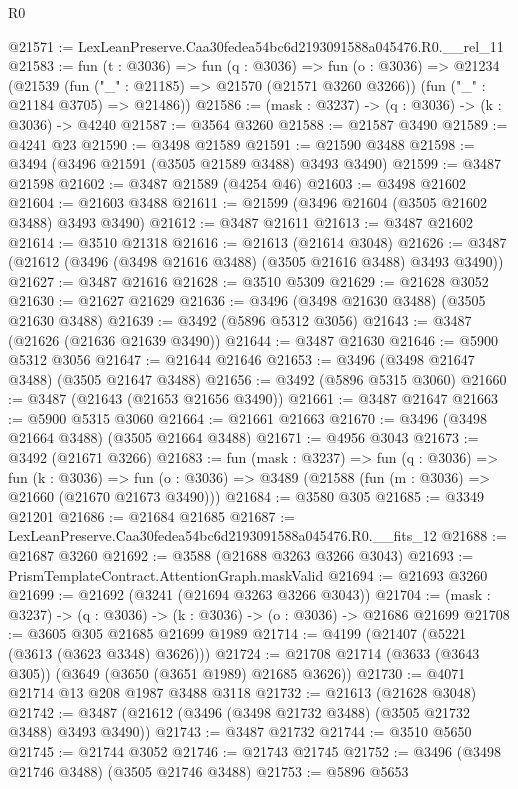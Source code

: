 \begin{lexlean}{R0}
\begin{coremodule}
@21571 := LexLeanPreserve.Caa30fedea54bc6d2193091588a045476.R0.__rel_11
@21583 := fun (t : @3036) =>
  fun (q : @3036) =>
  fun (o : @3036) =>
  @21234
    (@21539
      (fun ("_" : @21185) => @21570 (@21571 @3260 @3266))
      (fun ("_" : @21184 @3705) => @21486))
@21586 := (mask : @3237) -> (q : @3036) -> (k : @3036) -> @4240
@21587 := @3564 @3260
@21588 := @21587 @3490
@21589 := @4241 @23
@21590 := @3498 @21589
@21591 := @21590 @3488
@21598 := @3494 (@3496 @21591 (@3505 @21589 @3488) @3493 @3490)
@21599 := @3487 @21598
@21602 := @3487 @21589 (@4254 @46)
@21603 := @3498 @21602
@21604 := @21603 @3488
@21611 := @21599 (@3496 @21604 (@3505 @21602 @3488) @3493 @3490)
@21612 := @3487 @21611
@21613 := @3487 @21602
@21614 := @3510 @21318
@21616 := @21613 (@21614 @3048)
@21626 := @3487 (@21612 (@3496 (@3498 @21616 @3488) (@3505 @21616 @3488) @3493 @3490))
@21627 := @3487 @21616
@21628 := @3510 @5309
@21629 := @21628 @3052
@21630 := @21627 @21629
@21636 := @3496 (@3498 @21630 @3488) (@3505 @21630 @3488)
@21639 := @3492 (@5896 @5312 @3056)
@21643 := @3487 (@21626 (@21636 @21639 @3490))
@21644 := @3487 @21630
@21646 := @5900 @5312 @3056
@21647 := @21644 @21646
@21653 := @3496 (@3498 @21647 @3488) (@3505 @21647 @3488)
@21656 := @3492 (@5896 @5315 @3060)
@21660 := @3487 (@21643 (@21653 @21656 @3490))
@21661 := @3487 @21647
@21663 := @5900 @5315 @3060
@21664 := @21661 @21663
@21670 := @3496 (@3498 @21664 @3488) (@3505 @21664 @3488)
@21671 := @4956 @3043
@21673 := @3492 (@21671 @3266)
@21683 := fun (mask : @3237) =>
  fun (q : @3036) =>
  fun (k : @3036) =>
  fun (o : @3036) => @3489 (@21588 (fun (m : @3036) => @21660 (@21670 @21673 @3490)))
@21684 := @3580 @305
@21685 := @3349 @21201
@21686 := @21684 @21685
@21687 := LexLeanPreserve.Caa30fedea54bc6d2193091588a045476.R0.__fits_12
@21688 := @21687 @3260
@21692 := @3588 (@21688 @3263 @3266 @3043)
@21693 := PrismTemplateContract.AttentionGraph.maskValid
@21694 := @21693 @3260
@21699 := @21692 (@3241 (@21694 @3263 @3266 @3043))
@21704 := (mask : @3237) -> (q : @3036) -> (k : @3036) -> (o : @3036) -> @21686 @21699
@21708 := @3605 @305 @21685 @21699 @1989
@21714 := @4199 (@21407 (@5221 (@3613 (@3623 @3348) @3626)))
@21724 := @21708 @21714 (@3633 (@3643 @305)) (@3649 (@3650 (@3651 @1989) @21685 @3626))
@21730 := @4071 @21714 @13 @208 @1987 @3488 @3118
@21732 := @21613 (@21628 @3048)
@21742 := @3487 (@21612 (@3496 (@3498 @21732 @3488) (@3505 @21732 @3488) @3493 @3490))
@21743 := @3487 @21732
@21744 := @3510 @5650
@21745 := @21744 @3052
@21746 := @21743 @21745
@21752 := @3496 (@3498 @21746 @3488) (@3505 @21746 @3488)
@21753 := @5896 @5653

\end{coremodule}
\end{lexlean}
